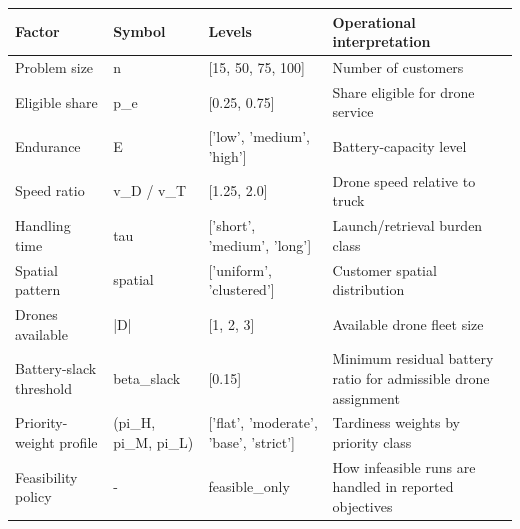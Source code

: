 \begin{tabular}{llll}
\toprule
Factor & Symbol & Levels & Operational interpretation \\
\midrule
Problem size & n & [15, 50, 75, 100] & Number of customers \\
Eligible share & p_e & [0.25, 0.75] & Share eligible for drone service \\
Endurance & E & ['low', 'medium', 'high'] & Battery-capacity level \\
Speed ratio & v_D / v_T & [1.25, 2.0] & Drone speed relative to truck \\
Handling time & tau & ['short', 'medium', 'long'] & Launch/retrieval burden class \\
Spatial pattern & spatial & ['uniform', 'clustered'] & Customer spatial distribution \\
Drones available & |D| & [1, 2, 3] & Available drone fleet size \\
Battery-slack threshold & beta_slack & [0.15] & Minimum residual battery ratio for admissible drone assignment \\
Priority-weight profile & (pi_H, pi_M, pi_L) & ['flat', 'moderate', 'base', 'strict'] & Tardiness weights by priority class \\
Feasibility policy & - & feasible_only & How infeasible runs are handled in reported objectives \\
\bottomrule
\end{tabular}

